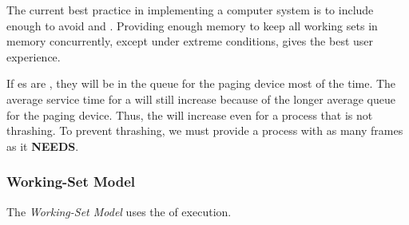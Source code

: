 \begin{remark*}
  The current best practice in implementing a computer system is to include enough  to avoid  and .
  Providing enough memory to keep all working sets in memory concurrently, except under extreme conditions, gives the best user experience.
\end{remark*}

If es are , they will be in the queue for the paging device most of the time.
The average service time for a  will still increase because of the longer average queue for the paging device.
Thus, the  will increase even for a process that is not thrashing.
To prevent thrashing, we must provide a process with as many frames as it \textbf{NEEDS}.

\subsubsection{Working-Set Model}\label{subsubsec:Working_Set_Model}
The \emph{Working-Set Model} uses the  of  execution.


